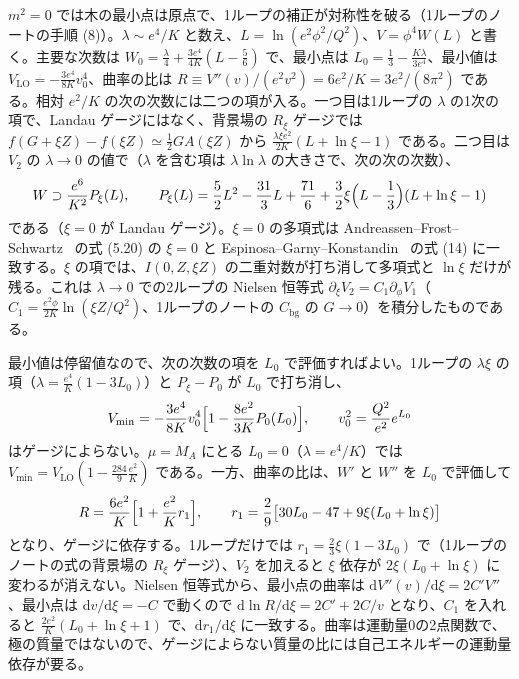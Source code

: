 \documentclass[a4paper,10pt]{ltjsarticle}
\newcommand{\dd}{\mathrm{d}}
\begin{document}
$m^2=0$ では木の最小点は原点で、1ループの補正が対称性を破る（1ループのノートの手順 (8)）。$\lambda\sim e^4/K$ と数え、$L=\ln(e^2\phi^2/Q^2)$、$V=\phi^4W(L)$ と書く。主要な次数は $W_0=\frac\lambda4+\frac{3e^4}{4K}(L-\frac56)$ で、最小点は $L_0=\frac13-\frac{K\lambda}{3e^4}$、最小値は $V_{\mathrm{LO}}=-\frac{3e^4}{8K}v_0^4$、曲率の比は $R\equiv V''(v)/(e^2v^2)=6e^2/K=3e^2/(8\pi^2)$ である。相対 $e^2/K$ の次の次数には二つの項が入る。一つ目は1ループの $\lambda$ の1次の項で、Landau ゲージにはなく、背景場の $R_\xi$ ゲージでは $f(G+\xi Z)-f(\xi Z)\simeq\frac12GA(\xi Z)$ から $\frac{\lambda\xi e^2}{2K}(L+\ln\xi-1)$ である。二つ目は $V_2$ の $\lambda\to0$ の値で（$\lambda$ を含む項は $\lambda\ln\lambda$ の大きさで、次の次の次数）、
\begin{equation}
W\supset\frac{e^6}{K^2}P_\xi(L),\qquad P_\xi(L)=\frac52L^2-\frac{31}3L+\frac{71}6+\frac32\xi\Bigl(L-\frac13\Bigr)(L+\ln\xi-1)
\label{eq:Pxi}
\end{equation}
である（$\xi=0$ が Landau ゲージ）。$\xi=0$ の多項式は Andreassen--Frost--Schwartz~\cite{afs15} の式 (5.20) の $\xi=0$ と Espinosa--Garny--Konstandin~\cite{egk16} の式 (14) に一致する。$\xi$ の項では、$I(0,Z,\xi Z)$ の二重対数が打ち消して多項式と $\ln\xi$ だけが残る。これは $\lambda\to0$ での2ループの Nielsen 恒等式 $\partial_\xi V_2=C_1\partial_\phi V_1$（$C_1=\frac{e^2\phi}{2K}\ln(\xi Z/Q^2)$、1ループのノートの $C_{\mathrm{bg}}$ の $G\to0$）を積分したものである。

最小値は停留値なので、次の次数の項を $L_0$ で評価すればよい。1ループの $\lambda\xi$ の項（$\lambda=\frac{e^4}K(1-3L_0)$）と $P_\xi-P_0$ が $L_0$ で打ち消し、
\begin{equation}
V_{\min}=-\frac{3e^4}{8K}v_0^4\Bigl[1-\frac{8e^2}{3K}P_0(L_0)\Bigr],\qquad v_0^2=\frac{Q^2}{e^2}e^{L_0}
\label{eq:cwvmin}
\end{equation}
はゲージによらない。$\mu=M_A$ にとる $L_0=0$（$\lambda=e^4/K$）では $V_{\min}=V_{\mathrm{LO}}(1-\frac{284}9\frac{e^2}K)$ である。一方、曲率の比は、$W'$ と $W''$ を $L_0$ で評価して
\begin{equation}
R=\frac{6e^2}K\Bigl[1+\frac{e^2}Kr_1\Bigr],\qquad r_1=\frac29\bigl[30L_0-47+9\xi(L_0+\ln\xi)\bigr]
\label{eq:cwR}
\end{equation}
となり、ゲージに依存する。1ループだけでは $r_1=\frac23\xi(1-3L_0)$ で（1ループのノートの式の背景場の $R_\xi$ ゲージ）、$V_2$ を加えると $\xi$ 依存が $2\xi(L_0+\ln\xi)$ に変わるが消えない。Nielsen 恒等式から、最小点の曲率は $\dd V''(v)/\dd\xi=2C'V''$、最小点は $\dd v/\dd\xi=-C$ で動くので $\dd\ln R/\dd\xi=2C'+2C/v$ となり、$C_1$ を入れると $\frac{2e^2}K(L_0+\ln\xi+1)$ で、$\dd r_1/\dd\xi$ に一致する。曲率は運動量0の2点関数で、極の質量ではないので、ゲージによらない質量の比には自己エネルギーの運動量依存が要る。
\end{document}
